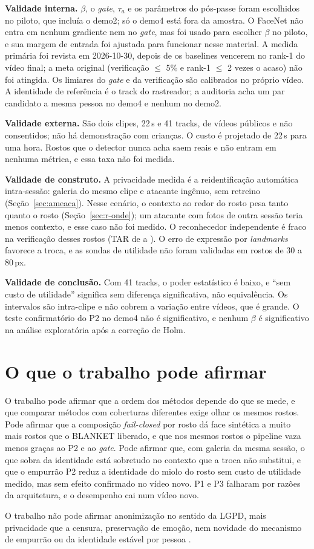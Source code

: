\textbf{Validade interna.} $\beta$, o \emph{gate}, $\tau_a$ e os parâmetros do pós-passe foram escolhidos no piloto, que incluía o demo2; só o demo4 está fora da amostra. O FaceNet não entra em nenhum gradiente nem no \emph{gate}, mas foi usado para escolher $\beta$ no piloto, e sua margem de entrada foi ajustada para funcionar nesse material. A medida primária foi revista em 2026-10-30, depois de os baselines vencerem no rank-1 do vídeo final; a meta original (verificação $\le$ 5\% e rank-1 $\le$ 2 vezes o acaso) não foi atingida. Os limiares do \emph{gate} e da verificação são calibrados no próprio vídeo. A identidade de referência é o track do rastreador; a auditoria acha um par candidato a mesma pessoa no demo4 e nenhum no demo2.

\textbf{Validade externa.} São dois clipes, 22\,s e 41 tracks, de vídeos públicos e não consentidos; não há demonstração com crianças. O custo é projetado de 22\,s para uma hora. Rostos que o detector nunca acha saem reais e não entram em nenhuma métrica, e essa taxa não foi medida.

\textbf{Validade de construto.} A privacidade medida é a reidentificação automática intra-sessão: galeria do mesmo clipe e atacante ingênuo, sem retreino (Seção~\ref{sec:ameaca}). Nesse cenário, o contexto ao redor do rosto pesa tanto quanto o rosto (Seção~\ref{sec:r-onde}); um atacante com fotos de outra sessão teria menos contexto, e esse caso não foi medido. O reconhecedor independente é fraco na verificação desses rostos (TAR de  a ). O erro de expressão por \emph{landmarks} favorece a troca, e as sondas de utilidade não foram validadas em rostos de 30 a 80\,px.

\textbf{Validade de conclusão.} Com 41 tracks, o poder estatístico é baixo, e ``sem custo de utilidade'' significa sem diferença significativa, não equivalência. Os intervalos são intra-clipe e não cobrem a variação entre vídeos, que é grande. O teste confirmatório do P2 no demo4 não é significativo, e nenhum $\beta$ é significativo na análise exploratória após a correção de Holm.

\section{O que o trabalho pode afirmar}

O trabalho pode afirmar que a ordem dos métodos depende do que se mede, e que comparar métodos com coberturas diferentes exige olhar os mesmos rostos. Pode afirmar que a composição \emph{fail-closed} por rosto dá face sintética a muito mais rostos que o BLANKET liberado, e que nos mesmos rostos o pipeline vaza menos graças ao P2 e ao \emph{gate}. Pode afirmar que, com galeria da mesma sessão, o que sobra da identidade está sobretudo no contexto que a troca não substitui, e que o empurrão P2 reduz a identidade do miolo do rosto sem custo de utilidade medido, mas sem efeito confirmado no vídeo novo. P1 e P3 falharam por razões da arquitetura, e o desempenho cai num vídeo novo.

O trabalho não pode afirmar anonimização no sentido da LGPD, mais privacidade que a censura, preservação de emoção, nem novidade do mecanismo de empurrão ou da identidade estável por pessoa \citep{fiva,nullface,kung,revpers}.
